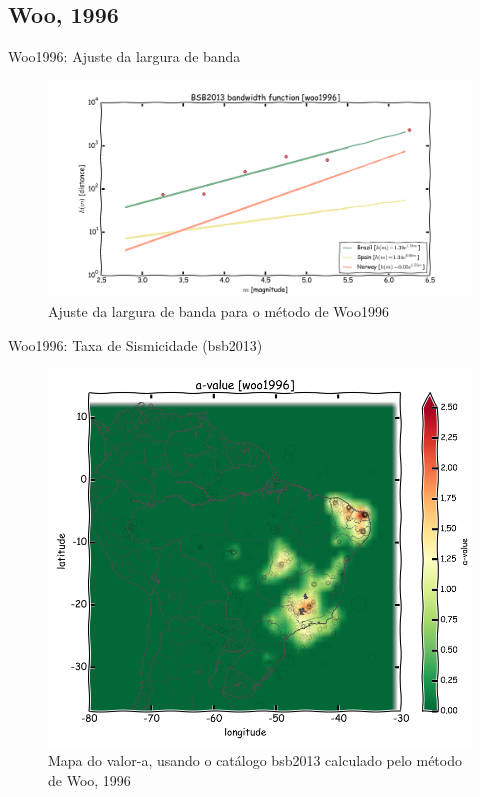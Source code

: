 \documentclass[ucs,8pt]{beamer}
\begin{document}
\subsection{Woo, 1996}


\begin{frame}{Woo1996: Ajuste da largura de banda}
\begin{figure}[H]
  \centering
  \includegraphics[width=.90\textwidth]{woo_bandwidth} 
  \caption{Ajuste da largura de banda para o método de Woo1996}
  \label{fig:woo_b} 
\end{figure}
\end{frame}


\begin{frame}{Woo1996: Taxa de Sismicidade (\gls{bsb2013})}

\begin{figure}[H]
  \centering
  \includegraphics[height=.95\textheight]{a_woo} 
  \caption{Mapa do valor-a, usando o catálogo \gls{bsb2013} calculado pelo método de Woo, 1996 }
  \label{fig:a_woo} 
\end{figure}

\end{frame}
\end{document}
